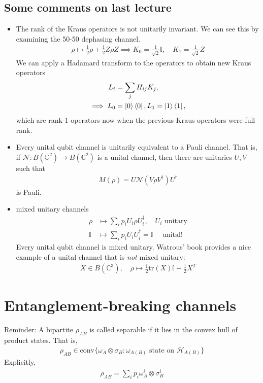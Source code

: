 \documentclass[../../note.tex]{subfiles}
\begin{document}
\subsection{Some comments on last lecture}
\begin{itemize}
    \item The rank of the Kraus operators is not unitarily invariant. We can see this by examining the 50-50 dephasing channel. 
    \begin{align}
        \rho \mapsto \frac{1}{2} \rho + \frac{1}{2} Z \rho Z \implies K_0 = \frac{1}{\sqrt{2}} \mathbb{I},\quad K_1 = \frac{1}{\sqrt{2}} Z
    \end{align}
    We can apply a Hadamard transform to the operators to obtain new Kraus operators
    \begin{align}
    L_i &= \sum_j H_{ij}K_j, \\
       \implies L_0 &= \ket{0}\bra{0}, L_1 = \ket{1}\bra{1},
    \end{align}
    which are rank-1 operators now when the previous Kraus operators were full rank. 
    \item Every unital qubit channel is unitarily equivalent to a Pauli channel. That is, if $\mathcal{N}: B(\mathbb{C}^2)\rightarrow B(\mathbb{C}^2)$ is a unital channel, then there are unitaries $U,V$ such that 
    \begin{align}
        M(\rho)= U\mathcal{N}(V \rho V^{\dagger})U^{\dagger}
    \end{align}
    is Pauli.
    \item mixed unitary channels 
    \begin{align}
        \rho &\mapsto \sum_i p_i U_i \rho U_i^{\dagger}, \quad U_i \text{ unitary}\\
        \mathbb{I} &\mapsto \sum_i p_i U_i U_i^{\dagger} = \mathbb{I} \quad \text{ unital! }
    \end{align}
    Every unital qubit channel is mixed unitary. Watrous' book provides a nice example of a unital channel that is \textit{not} mixed unitary:
    \begin{align}
        X \in B(\mathbb{C}^3), \quad \rho \mapsto \frac{1}{2}\text{tr}(X) \mathbb{I} -\frac{1}{2} X^T
    \end{align}
\end{itemize}

\section{Entanglement-breaking channels}
Reminder: A bipartite $\rho_{AB}$ is called separable if it lies in the convex hull of product states. That is,
\begin{align}
    \rho_{AB} \in \text{conv}\{\omega_A \otimes \sigma_B : \omega_{A(B)} \text{ state on } \mathcal{H}_{A(B)}\}
\end{align}
Explicitly, 
\begin{align}
    \rho_{AB} = \sum_i p_i \omega^i_A \otimes \sigma_B^i
\end{align}
\end{document}
